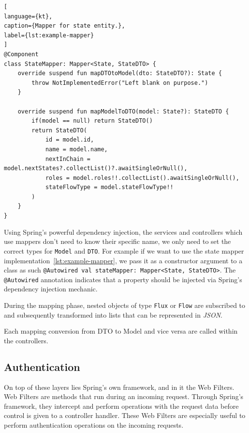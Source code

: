 \begin{lstlisting}[
language={kt},
caption={Mapper for state entity.},
label={lst:example-mapper}
]
@Component
class StateMapper: Mapper<State, StateDTO> {
    override suspend fun mapDTOtoModel(dto: StateDTO?): State {
        throw NotImplementedError("Left blank on purpose.")
    }

    override suspend fun mapModelToDTO(model: State?): StateDTO {
        if(model == null) return StateDTO()
        return StateDTO(
            id = model.id,
            name = model.name,
            nextInChain = model.nextStates?.collectList()?.awaitSingleOrNull(),
            roles = model.roles!!.collectList().awaitSingleOrNull(),
            stateFlowType = model.stateFlowType!!
        )
    }
}    
\end{lstlisting}

Using Spring's powerful dependency injection, the services and controllers which use mappers don't need to know their specific name, we only need to set the correct types for \lstinline{Model} and \lstinline{DTO}. For example if we want to use the state mapper implementation~\ref{lst:example-mapper}, we pass it as a constructor argument to a class as such \lstinline{@Autowired val stateMapper: Mapper<State, StateDTO>}. The \lstinline{@Autowired} annotation indicates that a property should be injected via Spring's dependency injection mechanic.

During the mapping phase, nested objects of type \lstinline{Flux} or \lstinline{Flow} are subscribed to and subsequently transformed into lists that can be represented in \textit{JSON}.

Each mapping conversion from DTO to Model and vice versa are called within the controllers.


\subsection{Authentication}\label{ch:impl:sec:be:subsec:authentication}

On top of these layers lies Spring's own framework, and in it the Web Filters. Web Filters are methods that run during an incoming request. Through Spring's framework, they intercept and perform operations with the request data before control is given to a controller handler. 
These Web Filters are especially useful to perform authentication operations on the incoming requests.


